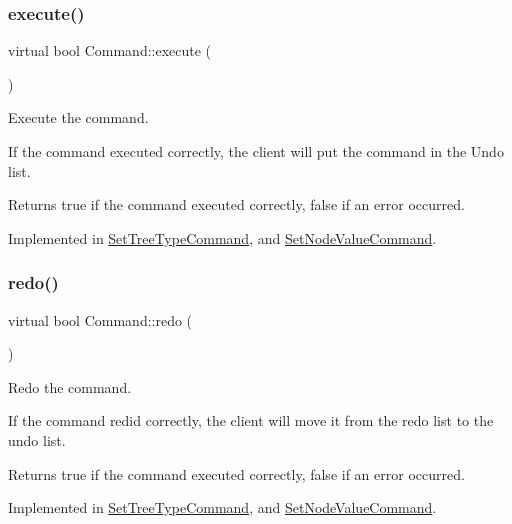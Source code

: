 \subsubsection{\texorpdfstring{execute()}{execute()}}
{\footnotesize\ttfamily virtual bool Command\+::execute (\begin{DoxyParamCaption}{ }\end{DoxyParamCaption})\hspace{0.3cm}{\ttfamily [pure virtual]}}



Execute the command. 

If the command executed correctly, the client will put the command in the Undo list. \begin{DoxyReturn}{Returns}
true if the command executed correctly, false if an error occurred. 
\end{DoxyReturn}


Implemented in \mbox{\hyperlink{class_set_tree_type_command_af11ff06bfd5b1068828ba3d1702d291e}{Set\+Tree\+Type\+Command}}, and \mbox{\hyperlink{class_set_node_value_command_a0330dab0773c047deefe2eb551d6fc5e}{Set\+Node\+Value\+Command}}.

\mbox{\label{class_command_ab222d875ec449c40467173edb28e5460}} 
\subsubsection{\texorpdfstring{redo()}{redo()}}
{\footnotesize\ttfamily virtual bool Command\+::redo (\begin{DoxyParamCaption}{ }\end{DoxyParamCaption})\hspace{0.3cm}{\ttfamily [pure virtual]}}



Redo the command. 

If the command redid correctly, the client will move it from the redo list to the undo list. \begin{DoxyReturn}{Returns}
true if the command executed correctly, false if an error occurred. 
\end{DoxyReturn}


Implemented in \mbox{\hyperlink{class_set_tree_type_command_a16b5d34a58f58a5daad23f8c32fc14b4}{Set\+Tree\+Type\+Command}}, and \mbox{\hyperlink{class_set_node_value_command_a839cb93ffcaab91e245995aa367e07c7}{Set\+Node\+Value\+Command}}.

